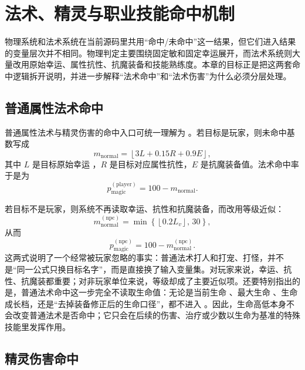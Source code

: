\chapter{法术、精灵与职业技能命中机制}

物理系统和法术系统在当前源码里共用“命中/未命中”这一结果，但它们进入结果的变量层次并不相同。物理判定主要围绕固定敏和固定幸运展开，而法术系统则大量改用原始幸运、属性抗性、抗魔装备和技能熟练度。本章的目标正是把这两套命中逻辑拆开说明，并进一步解释“法术命中”和“法术伤害”为什么必须分层处理。

\section{普通属性法术命中}

普通属性法术与精灵伤害的命中入口可统一理解为 。若目标是玩家，则未命中基数写成
\begin{equation}
    m_{\mathrm{normal}}
    = \left\lfloor 3L + 0.15R + 0.9E \right\rfloor,
    \label{eq:magic-miss-player}
\end{equation}
其中 $L$ 是目标原始幸运 ，$R$ 是目标对应属性抗性，$E$ 是抗魔装备值。法术命中率于是为
\begin{equation}
    p_{\mathrm{magic}}^{(\mathrm{player})}=100-m_{\mathrm{normal}}.
    \label{eq:magic-hit-player}
\end{equation}

若目标不是玩家，则系统不再读取幸运、抗性和抗魔装备，而改用等级近似：
\begin{equation}
    m_{\mathrm{normal}}^{(\mathrm{npc})} = \min\left\{\left\lfloor 0.2L_v \right\rfloor,\,30\right\},
\end{equation}
从而
\begin{equation}
    p_{\mathrm{magic}}^{(\mathrm{npc})}=100-m_{\mathrm{normal}}^{(\mathrm{npc})}.
\end{equation}
这两式说明了一个经常被玩家忽略的事实：普通法术打人和打宠、打怪，并不是“同一公式只换目标名字”，而是直接换了输入变量集。对玩家来说，幸运、抗性、抗魔装都重要；对非玩家单位来说，等级却成了主要近似项。还要特别指出的是，普通法术命中这一步完全不读取生命值：无论是当前生命 、最大生命 、生命成长档，还是“去掉装备修正后的生命口径”，都不进入 。因此，生命高低本身不会改变普通法术是否命中；它只会在后续的伤害、治疗或少数以生命为基准的特殊技能里发挥作用。

\section{精灵伤害命中}

